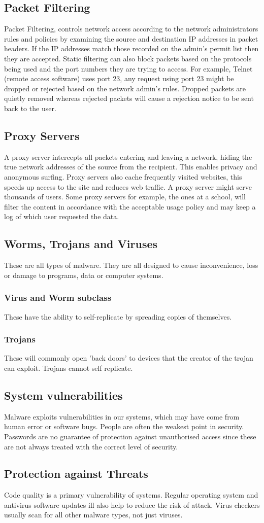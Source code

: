 \documentclass[a4paper,11pt, twocolumn]{article}
\begin{document}
\subsection{Packet Filtering}
Packet Filtering, controls network access according to the network administrators rules and policies by examining the source and destination IP addresses in packet headers. If the IP addresses match those recorded on the admin's permit list then they are accepted. Static filtering can also block packets based on the protocols being used and the port numbers they are trying to access. For example, Telnet (remote access software) uses port 23, any request using port 23 might be dropped or rejected based on the network admin's rules. Dropped packets are quietly removed whereas rejected packets will cause a rejection notice to be sent back to the user.
\subsection{Proxy Servers}
A proxy server intercepts all packets entering and leaving a network, hiding the true network addresses of the source from the recipient. This enables privacy and anonymous surfing. Proxy servers also cache frequently visited websites, this speeds up access to the site and reduces web traffic. A proxy server might serve thousands of users. Some proxy servers for example, the ones at a school, will filter the content in accordance with the acceptable usage policy and may keep a log of which user requested the data.
\subsection{Worms, Trojans and Viruses}
These are all types of malware. They are all designed to cause inconvenience, loss or damage to programs, data or computer systems.
\subsubsection{Virus and Worm subclass}
These have the ability to self-replicate by spreading copies of themselves.
\subsubsection{Trojans}
These will commonly open 'back doors' to devices that the creator of the trojan can exploit. Trojans cannot self replicate.
\subsection{System vulnerabilities}
Malware exploits vulnerabilities in our systems, which may have come from human error or software bugs. People are often the weakest point in security. Passwords are no guarantee of protection against unauthorised access since these are not always treated with the correct level of security.
\subsection{Protection against Threats}
Code quality is a primary vulnerability of systems. Regular operating system and antivirus software updates ill also help to reduce the risk of attack. Virus checkers usually scan for all other malware types, not just viruses. 
\end{document}
